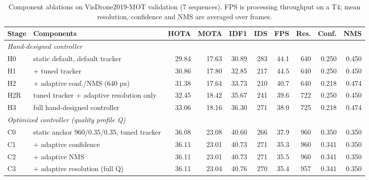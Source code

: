 \begin{table}[tbp]
\centering
\caption{Component ablations on VisDrone2019-MOT validation (7 sequences). FPS is processing throughput on a T4; mean resolution, confidence and NMS are averaged over frames.}
\label{tab:ch4-ablation}
\small\setlength{\tabcolsep}{4pt}
\begin{adjustbox}{max width=\textwidth}
\begin{tabular}{llrrrrrrrr}
\hline
Stage & Components & HOTA & MOTA & IDF1 & IDS & FPS & Res. & Conf. & NMS \\
\hline
\multicolumn{10}{l}{\textit{Hand-designed controller}}\\
H0 & static default, default tracker & 29.84 & 17.63 & 30.89 & 283 & 44.1 & 640 & 0.250 & 0.450 \\
H1 & + tuned tracker & 30.86 & 17.80 & 32.85 & 217 & 44.5 & 640 & 0.250 & 0.450 \\
H2 & + adaptive conf./NMS (640 px) & 31.38 & 17.64 & 33.73 & 210 & 40.7 & 640 & 0.218 & 0.474 \\
H2R & tuned tracker + adaptive resolution only & 32.45 & 18.42 & 35.67 & 241 & 39.6 & 722 & 0.250 & 0.450 \\
H3 & full hand-designed controller & 33.06 & 18.16 & 36.30 & 271 & 38.0 & 725 & 0.218 & 0.474 \\
\multicolumn{10}{l}{\textit{Optimized controller (quality profile Q)}}\\
C0 & static anchor 960/0.35/0.35, tuned tracker & 36.08 & 23.08 & 40.60 & 266 & 37.9 & 960 & 0.350 & 0.350 \\
C1 & + adaptive confidence & 36.11 & 23.01 & 40.73 & 271 & 35.3 & 960 & 0.341 & 0.350 \\
C2 & + adaptive NMS & 36.11 & 23.01 & 40.73 & 271 & 35.5 & 960 & 0.341 & 0.350 \\
C3 & + adaptive resolution (full Q) & 36.11 & 23.04 & 40.76 & 270 & 35.4 & 957 & 0.341 & 0.350 \\
\hline
\end{tabular}
\end{adjustbox}
\end{table}
